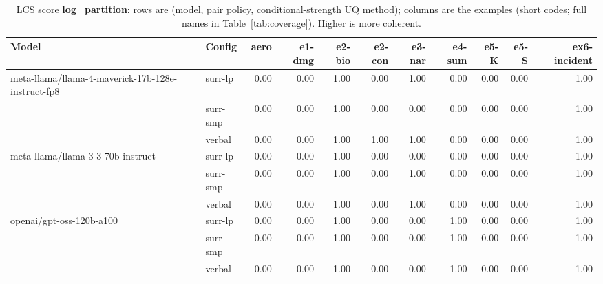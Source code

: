 \documentclass[11pt]{article}
\begin{document}
\begin{table}[htbp]
\centering
\footnotesize
\setlength{\tabcolsep}{3.5pt}
\caption{LCS score \textbf{log\_partition}: rows are (model, pair policy, conditional-strength UQ method); columns are the examples (short codes; full names in Table~\ref{tab:coverage}). Higher is more coherent.}
\label{tab:log-partition}
\begin{tabular}{llrrrrrrrrr}
\toprule
\textbf{Model} & \textbf{Config} & \textbf{aero} & \textbf{e1-dmg} & \textbf{e2-bio} & \textbf{e2-con} & \textbf{e3-nar} & \textbf{e4-sum} & \textbf{e5-K} & \textbf{e5-S} & \textbf{ex6-incident} \\
\midrule
meta-llama/llama-4-maverick-17b-128e-instruct-fp8 & surr-lp & 0.00 & 0.00 & 1.00 & 0.00 & 1.00 & 0.00 & 0.00 & 0.00 & 1.00 \\
 & surr-smp & 0.00 & 0.00 & 1.00 & 0.00 & 0.00 & 0.00 & 0.00 & 0.00 & 1.00 \\
 & verbal & 0.00 & 0.00 & 1.00 & 1.00 & 1.00 & 0.00 & 0.00 & 0.00 & 1.00 \\
\midrule
meta-llama/llama-3-3-70b-instruct & surr-lp & 0.00 & 0.00 & 1.00 & 0.00 & 0.00 & 0.00 & 0.00 & 0.00 & 1.00 \\
 & surr-smp & 0.00 & 0.00 & 1.00 & 0.00 & 1.00 & 0.00 & 0.00 & 0.00 & 1.00 \\
 & verbal & 0.00 & 0.00 & 1.00 & 0.00 & 1.00 & 0.00 & 0.00 & 0.00 & 1.00 \\
\midrule
openai/gpt-oss-120b-a100 & surr-lp & 0.00 & 0.00 & 1.00 & 0.00 & 0.00 & 1.00 & 0.00 & 0.00 & 1.00 \\
 & surr-smp & 0.00 & 0.00 & 1.00 & 0.00 & 0.00 & 1.00 & 0.00 & 0.00 & 1.00 \\
 & verbal & 0.00 & 0.00 & 1.00 & 0.00 & 0.00 & 1.00 & 0.00 & 0.00 & 1.00 \\
\bottomrule
\end{tabular}
\end{table}
\end{document}
